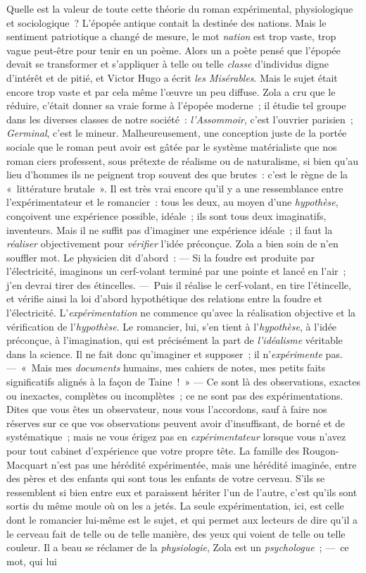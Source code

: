 \documentclass[french,twoside]{book} %
\begin{document}
Quelle est la valeur de toute cette théorie du roman expérimental, physiologique et sociologique ? L’épopée antique contait la destinée des nations. Mais le sentiment patriotique a changé de mesure, le mot \emph{nation} est trop vaste, trop vague peut-être pour tenir en un poème. Alors un a poète pensé que l’épopée devait se transformer et s’appliquer à telle ou telle \emph{classe} d’individus digne d’intérêt et de pitié, et Victor Hugo a écrit \emph{les Misérables}. Mais le sujet était encore trop vaste et par cela même l’œuvre un peu diffuse. Zola a cru que le réduire, c’était donner sa vraie forme à l’épopée moderne ; il étudie tel groupe dans les diverses classes de notre société : \emph{l’Assommoir}, c’est l’ouvrier parisien ; \emph{Germinal}, c’est le mineur. Malheureusement, une conception juste de la portée sociale que le roman peut avoir est gâtée par le système matérialiste que nos roman ciers professent, sous prétexte de réalisme ou de naturalisme, si bien qu’au lieu d’hommes ils ne peignent trop souvent des que brutes : c’est le règne de la « littérature brutale ». Il est très vrai encore qu’il y a une ressemblance entre l’expérimentateur et le romancier : tous les deux, au moyen d’une \emph{hypothèse}, conçoivent une expérience possible, idéale ; ils sont tous deux imaginatifs, inventeurs. Mais il ne suffit pas d’imaginer une expérience idéale ; il faut la \emph{réaliser} objectivement pour \emph{vérifier} l’idée préconçue. Zola a bien soin de n’en souffler mot. Le physicien dit d’abord : — Si la foudre est produite par l’électricité, imaginons un cerf-volant terminé par une pointe et lancé en l’air ; j’en devrai tirer des étincelles. — Puis il réalise le cerf-volant, en tire l’étincelle, et vérifie ainsi la loi d’abord hypothétique des relations entre la foudre et l’électricité. L’\emph{expérimentation} ne commence qu’avec la réalisation objective et la vérification de l’\emph{hypothèse}. Le romancier, lui, s’en tient à l’\emph{hypothèse}, à l’idée préconçue, à l’imagination, qui est précisément la part de \emph{l’idéalisme} véritable dans la science. Il ne fait donc qu’imaginer et supposer ; il n’\emph{expérimente} pas. — « Mais mes \emph{documents} humains, mes cahiers de notes, mes petits faits significatifs alignés à la façon de Taine ! » — Ce sont là des observations, exactes ou inexactes, complètes ou incomplètes ; ce ne sont pas des expérimentations. Dites que vous êtes un observateur, nous vous l’accordons, sauf à faire nos réserves sur ce que vos observations peuvent avoir d’insuffisant, de borné et de systématique ; mais ne vous érigez pas en \emph{expérimentateur} lorsque vous n’avez pour tout cabinet d’expérience que votre propre tête. La famille des Rougon-Macquart n’est pas une hérédité expérimentée, mais une hérédité imaginée, entre des pères et des enfants qui sont tous les enfants de votre cerveau. S’ils se ressemblent si bien entre eux et paraissent hériter l’un de l’autre, c’est qu’ils sont sortis du même moule où on les a jetés. La seule expérimentation, ici, est celle dont le romancier lui-même est le sujet, et qui permet aux lecteurs de dire qu’il a le cerveau fait de telle ou de telle manière, des yeux qui voient de telle ou telle couleur. Il a beau se réclamer de la \emph{physiologie}, Zola est un \emph{psychologue} ; — ce mot, qui lui 
\end{document}
